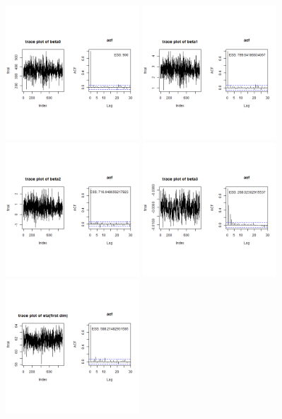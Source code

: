 \documentclass{article}
\begin{document}
\clearpage
\begin{figure}[!h]
    \centering
    \includegraphics[height=5cm]{prob2_beta0.png}
    \includegraphics[height=5cm]{prob2_beta1.png} \\
    \includegraphics[height=5cm]{prob2_beta2.png}
    \includegraphics[height=5cm]{prob2_beta3.png} \\
    \includegraphics[height=5cm]{prob2_eta(first_dim).png}

\end{figure}
\end{document}
